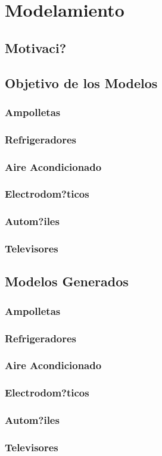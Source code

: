 \chapter{Modelamiento}
\label{ch:analis}

\section{Motivaci?}

\section{Objetivo de los Modelos}
\subsection{Ampolletas}
\subsection{Refrigeradores}
\subsection{Aire Acondicionado}
\subsection{Electrodom?ticos}
\subsection{Autom?iles}
\subsection{Televisores}

\section{Modelos Generados}
\subsection{Ampolletas}
\subsection{Refrigeradores}
\subsection{Aire Acondicionado}
\subsection{Electrodom?ticos}
\subsection{Autom?iles}
\subsection{Televisores}